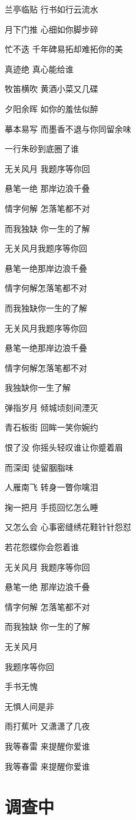 \documentclass[]{ctexbook}
\begin{document}
兰亭临贴 行书如行云流水

月下门推 心细如你脚步碎

忙不迭 千年碑易拓却难拓你的美

真迹绝 真心能给谁

牧笛横吹 黄酒小菜又几碟

夕阳余晖 如你的羞怯似醉

摹本易写 而墨香不退与你同留余味

一行朱砂到底圈了谁

无关风月 我题序等你回

悬笔一绝 那岸边浪千叠

情字何解 怎落笔都不对

而我独缺 你一生的了解

无关风月我题序等你回

悬笔一绝那岸边浪千叠

情字何解怎落笔都不对

而我独缺你一生的了解

无关风月我题序等你回

悬笔一绝那岸边浪千叠

情字何解怎落笔都不对

我独缺你一生了解

弹指岁月 倾城顷刻间湮灭

青石板街 回眸一笑你婉约

恨了没 你摇头轻叹谁让你蹙着眉

而深闺 徒留胭脂味

人雁南飞 转身一瞥你噙泪

掬一把月 手揽回忆怎么睡

又怎么会 心事密缝绣花鞋针针怨怼

若花怨蝶你会怨着谁

无关风月 我题序等你回

悬笔一绝 那岸边浪千叠

情字何解 怎落笔都不对

而我独缺 你一生的了解

无关风月

我题序等你回

手书无愧

无惧人间是非

雨打蕉叶 又潇潇了几夜

我等春雷 来提醒你爱谁

我等春雷 来提醒你爱谁

\section*{调查中}\label{diaochazhong}
\end{document}
